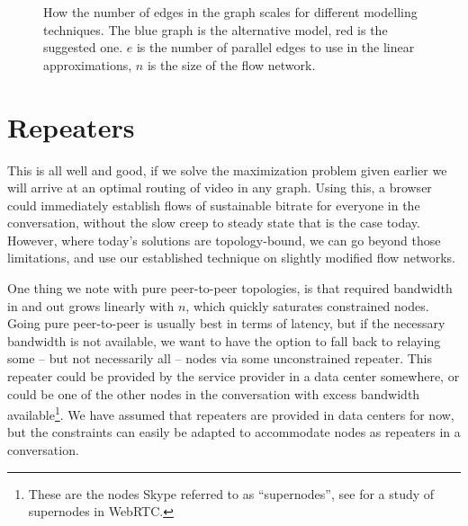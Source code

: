 \begin{figure}
    \centering
    \caption{How the number of edges in the graph scales for different modelling techniques. The blue graph is the alternative model, red is the suggested one. $e$ is the number of parallel edges to use in the linear approximations, $n$ is the size of the flow network.}
    \label{fig:model-scaling}
\end{figure}


\section{Repeaters}\label{sec:repeaters}

This is all well and good, if we solve the maximization problem given earlier we will arrive at an optimal routing of video in any graph. Using this, a browser could immediately establish flows of sustainable bitrate for everyone in the conversation, without the slow creep to steady state that is the case today. However, where today's solutions are topology-bound, we can go beyond those limitations, and use our established technique on slightly modified flow networks.

One thing we note with pure peer-to-peer topologies, is that required bandwidth in and out grows linearly with $n$, which quickly saturates constrained nodes. Going pure peer-to-peer is usually best in terms of latency, but if the necessary bandwidth is not available, we want to have the option to fall back to relaying some -- but not necessarily all -- nodes via some unconstrained repeater. This repeater could be provided by the service provider in a data center somewhere, or could be one of the other nodes in the conversation with excess bandwidth available\footnote{These are the nodes Skype referred to as ``supernodes'', see \cite{tree-topology-webrtc} for a study of supernodes in WebRTC.}. We have assumed that repeaters are provided in data centers for now, but the constraints can easily be adapted to accommodate nodes as repeaters in a conversation.

